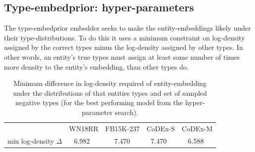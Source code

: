 \subsection{Type-embedprior: hyper-parameters}\label{sec:analysis:type_embed:hparam}
The type-embedprior embedder seeks to make the entity-embeddings likely under their type-distributions. To do this it uses a minimum constraint on log-density assigned by the correct types minus the log-density assigned by other types. In other words, an entity's true types must assign at least some number of times more density to the entity's embedding, than other types do.
\begin{table}
    \def\fn{\hspace{2pt}} %
    \setlength{\tabcolsep}{5pt}
    \centering
    \begin{tabular}{lr@{\fn}lr@{\fn}lr@{\fn}lr@{\fn}l}
        \toprule
                &\multicolumn{2}{c}{WN18RR}
                            &\multicolumn{2}{c}{FB15K-237}   
                                           & \multicolumn{2}{c}{CoDEx-S}   
                                                                & \multicolumn{2}{c}{CoDEx-M} \\
        \cmidrule{1-9}
        min log-density $\Delta$ & 6.982 && 7.470 && 7.470 && 6.588 \\
        \bottomrule
    \end{tabular} %
    \caption[Differences in log-density required of entity-embedding under type distributions.]{Minimum difference in log-density required of entity-embedding under the distributions of that entities types and set of sampled negative types (for the best performing model from the hyper-parameter search).} \label{tab:min_log_density_delta}
\end{table}

